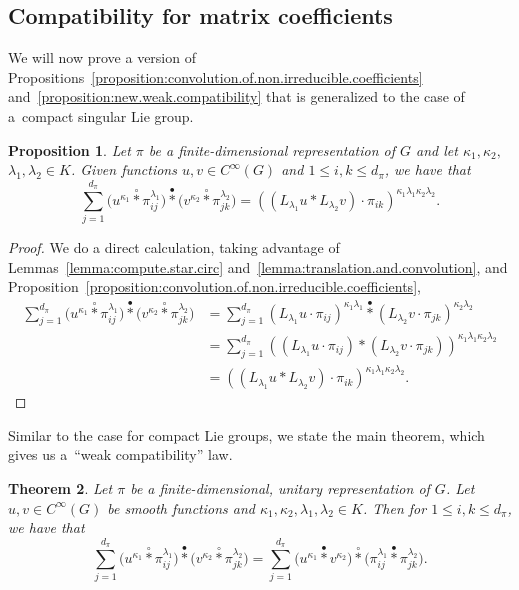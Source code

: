 \documentclass[pdftex]{sigma}
\numberwithin{equation}{section}
\newtheorem{Theorem}{Theorem}[section]
\newtheorem{Proposition}[Theorem]{Proposition}
\theoremstyle{definition}
\newcommand{\stardot}{\overset{{\bullet}}{*}}
\newcommand{\starcirc}{\overset{\circ}{*}}
\begin{document}
\subsection{Compatibility for matrix coefficients}
We will now prove a version of Propositions~\ref{proposition:convolution.of.non.irreducible.coefficients} and~\ref{proposition:new.weak.compatibility} that is generalized to the case of a~compact singular Lie group.
\begin{Proposition}\label{proposition:new.weak.compat}
   Let $ \pi $ be a finite-dimensional representation of $ G $ and let $ \kappa_1, \kappa_2,$ $\lambda_1, \lambda_2 \in K $. Given functions $ u, v \in C^\infty(G) $ and $ 1 \le i,k \le d_\pi $, we have that
  \[
   \sum_{j = 1}^{d_\pi} \big( u^{\kappa_1} \starcirc \pi_{ij}^{\lambda_1} \big) \stardot \big( v^{\kappa_2} \starcirc \pi_{jk}^{\lambda_2} \big) =  ( (L_{\lambda_1}u * L_{\lambda_2} v ) \cdot \pi_{ik} )^{\kappa_1 \lambda_1 \kappa_2 \lambda_2}.
  \]
\end{Proposition}
\begin{proof}
We do a direct calculation, taking advantage of Lemmas~\ref{lemma:compute.star.circ} and~\ref{lemma:translation.and.convolution}, and Proposition~\ref{proposition:convolution.of.non.irreducible.coefficients},
\begin{align*}
  \sum_{j = 1}^{d_\pi} \big( u^{\kappa_1} \starcirc \pi_{ij}^{\lambda_1} \big) \stardot \big( v^{\kappa_2} \starcirc \pi_{jk}^{\lambda_2} \big)
  &= \sum_{j = 1}^{d_\pi} ( L_{\lambda_1} u \cdot \pi_{ij})^{\kappa_1\lambda_1} \stardot ( L_{\lambda_2}
 v \cdot \pi_{jk} )^{\kappa_2 \lambda_2} \\
  &=\sum_{j=1}^{d_\pi} \left( (L_{\lambda_1} u \cdot \pi_{ij}) * (L_{\lambda_2} v \cdot \pi_{jk})\right)^{\kappa_1 \lambda_1 \kappa_2 \lambda_2} \\
  &= \left( (L_{\lambda_1} u * L_{\lambda_2} v ) \cdot \pi_{ik} \right)^{\kappa_1 \lambda_1 \kappa_2 \lambda_2 }.\tag*{\qed}
  \end{align*}\renewcommand{\qed}{}
\end{proof}

Similar to the case for compact Lie groups, we state the main theorem, which gives us a~``weak compatibility'' law.
\begin{Theorem}\label{theorem:new.main}
 Let $ \pi $ be a finite-dimensional, unitary representation of $ G $. Let $ u, v \in C^\infty(G) $ be smooth functions and $ \kappa_1, \kappa_2, \lambda_1, \lambda_2 \in K $. Then for
 $1 \le i,k \le d_{\pi} $, we have that
  \[
   \sum_{j = 1}^{d_\pi} \big( u^{\kappa_1} \starcirc \pi_{ij}^{\lambda_1} \big) \stardot \big( v^{\kappa_2} \starcirc \pi_{jk}^{\lambda_2} \big) =   \sum_{j = 1}^{d_\pi} \big( u^{\kappa_1} \stardot  v^{\kappa_2} \big) \starcirc \big(\pi_{ij}^{\lambda_1} \stardot \pi_{jk}^{\lambda_2} \big).
  \]
\end{Theorem}
\end{document}

